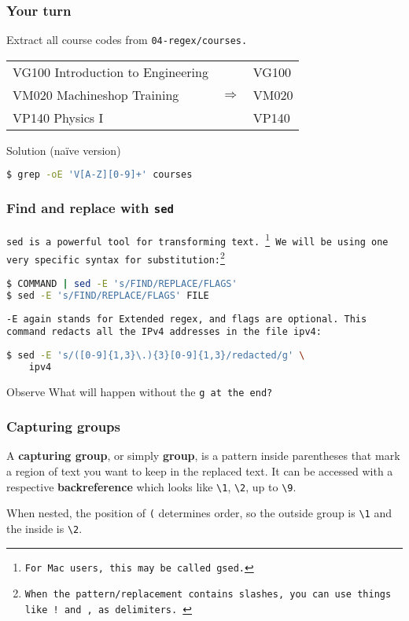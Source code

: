 \begin{frame}[fragile]
\frametitle{Your turn}
Extract all course codes from \tt{04-regex/courses}. \newline

\begin{example}
    \begin{tabular}{lcl}
        VG100 Introduction to Engineering & & VG100 \\
        VM020 Machineshop Training & $\Longrightarrow$ & VM020 \\
        VP140 Physics I & & VP140
    \end{tabular}
\end{example}
\pause
\begin{block}{Solution (naïve version)}
\begin{lstlisting}[language=bash]
$ grep -oE 'V[A-Z][0-9]+' courses
\end{lstlisting}
\end{block}
\end{frame}

\begin{frame}[fragile]
\frametitle{Find and replace with \tt{sed}}
\tt{sed} is a powerful tool for transforming text.
\footnote{For Mac users, this may be called \tt{gsed}.}
We will be using one very specific syntax for substitution:\footnote{
    When the pattern/replacement contains slashes, you can use things like
    \tt{!} and \tt{,} as delimiters.
}
\begin{lstlisting}[language=bash]
$ COMMAND | sed -E 's/FIND/REPLACE/FLAGS'
$ sed -E 's/FIND/REPLACE/FLAGS' FILE
\end{lstlisting}
\tt{-E} again stands for Extended regex, and flags are optional.
This command redacts all the IPv4 addresses in the file \tt{ipv4}:
\begin{lstlisting}[language=bash]
$ sed -E 's/([0-9]{1,3}\.){3}[0-9]{1,3}/redacted/g' \
    ipv4
\end{lstlisting}
\begin{block}{Observe}
    What will happen without the \tt{g} at the end?
\end{block}
\end{frame}

\begin{frame}[fragile]
\frametitle{Capturing groups}
A \textbf{capturing group}, or simply \textbf{group}, is a pattern inside
parentheses that mark a region of text you want to keep in the replaced text.
\newline \newline
It can be accessed with a respective \textbf{backreference} which looks like
\verb|\1|, \verb|\2|, up to \verb|\9|.

When nested, the position of \verb|(| determines order, so the outside group is
\verb|\1| and the inside is \verb|\2|.
\end{frame}

